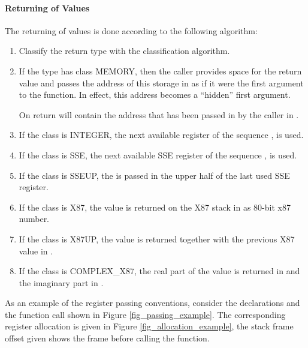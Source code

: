 \paragraph{Returning of Values}
The returning of values is done according to the following algorithm:
\begin{enumerate}
\item Classify the return type with the classification algorithm.

\item If the type has class MEMORY, then the caller provides space for
   the return value and passes the address of this storage in \RDI as
   if it were the first argument to the function.  In effect, this
   address becomes a ``hidden'' first argument.

   On return \RAX will contain the address that has been passed in by
   the caller in \RDI.

\item If the class is INTEGER, the next available register of the
   sequence \RAX, \RDX is used.

\item If the class is SSE, the next available SSE register of the
   sequence ,  is used.

\item If the class is SSEUP, the \eightbyte is passed in the upper half of the
   last used SSE register.

\item If the class is X87, the value is returned on the X87 stack in
    as 80-bit x87 number.

\item If the class is X87UP, the value is returned together with the
   previous X87 value in .
\item If the class is COMPLEX\_X87, the real part of the value is
  returned in  and the imaginary part in .
\end{enumerate}

As an example of the register passing conventions, consider the
declarations and the function call shown in
Figure \ref{fig_passing_example}.  The corresponding register
allocation is given in Figure \ref{fig_allocation_example}, the stack
frame offset given shows the frame before calling the function.

